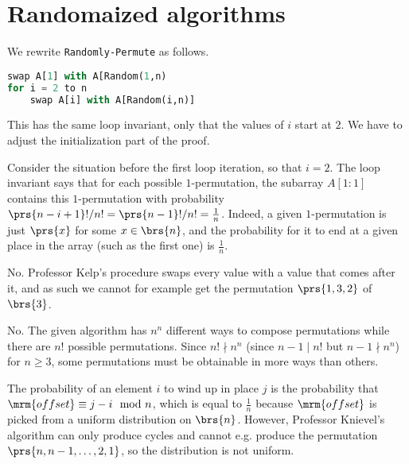\documentclass[oneside]{scrbook}
\newcommand{\codeword}[1]{\texttt{#1}}
\theoremstyle{definition}
\begin{document}
\section{Randomaized algorithms}

\begin{exercise}
We rewrite \codeword{Randomly-Permute} as follows.

\begin{lstlisting}[language=Python]
swap A[1] with A[Random(1,n)
for i = 2 to n
	swap A[i] with A[Random(i,n)]
\end{lstlisting}

This has the same loop invariant, only that the values of $i$ start at $2$. We have to adjust the initialization part of the proof.

Consider the situation before the first loop iteration, so that $i = 2$. The loop invariant says that for each possible $1$-permutation, the subarray $A[1:1]$ contains this $1$-permutation with probability $\prs{n-i+1}!/n! = \prs{n-1}!/n! = \frac{1}{n}$. Indeed, a given $1$-permutation is just $\prs{x}$ for some $x \in \brs{n}$, and the probability for it to end at a given place in the array (such as the first one) is $\frac{1}{n}$.

\end{exercise}

\begin{exercise}
No. Professor Kelp's procedure swaps every value with a value that comes after it, and as such we cannot for example get the permutation $\prs{1, 3, 2}$ of $\brs{3}$.
\end{exercise}

\begin{exercise}
No. The given algorithm has $n^n$ different ways to compose permutations while there are $n!$ possible permutations. Since $n! \nmid n^n$ (since $n-1 \mid n!$ but $n-1 \nmid n^n$) for $n \geq 3$, some permutations must be obtainable in more ways than others.
\end{exercise}

\begin{exercise}
The probability of an element $i$ to wind up in place $j$ is the probability that $\mrm{offset} \equiv j - i \mod{n}$, which is equal to $\frac{1}{n}$ because $\mrm{offset}$ is picked from a uniform distribution on $\brs{n}$. However, Professor Knievel's algorithm can only produce cycles and cannot e.g. produce the permutation $\prs{n, n-1, \ldots, 2, 1}$, so the distribution is not uniform.
\end{exercise}
\end{document}

